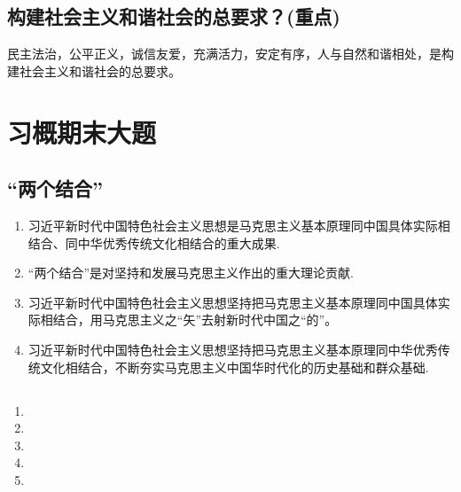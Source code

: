 \documentclass[12pt, a4paper, oneside]{ctexbook}
\begin{document}
\section{构建社会主义和谐社会的总要求？(重点)}

民主法治，公平正义，诚信友爱，充满活力，安定有序，人与自然和谐相处，是构建社会主义和谐社会的总要求。





\chapter{习概期末大题}

\section{“两个结合”}

\begin{enumerate}
\item 习近平新时代中国特色社会主义思想是马克思主义基本原理同中国具体实际相结合、同中华优秀传统文化相结合的重大成果.

\item “两个结合”是对坚持和发展马克思主义作出的重大理论贡献.

\item 习近平新时代中国特色社会主义思想坚持把马克思主义基本原理同中国具体实际相结合，用马克思主义之“矢”去射新时代中国之“的”。

\item 习近平新时代中国特色社会主义思想坚持把马克思主义基本原理同中华优秀传统文化相结合，不断夯实马克思主义中国华时代化的历史基础和群众基础.
\end{enumerate}

\section{}

\begin{enumerate}
\item 

\item 

\item 

\item 

\item 
\end{enumerate}

\section{}
\end{document}
